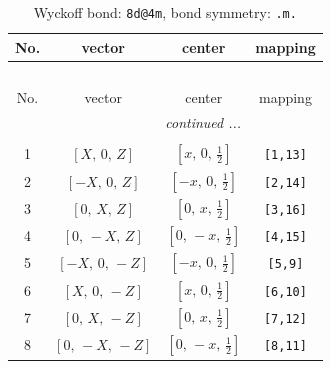 \documentclass[fleqn,8pt]{jsarticle}
\begin{document}
\begin{longtable}{cccc}
\caption{Wyckoff bond: {\tt 8d@4m}, bond symmetry: {\tt .m.}}
 \\
 \hline \hline
No. & vector & center & mapping \\ \hline \endfirsthead

\multicolumn{3}{l}{\tablename\ \thetable{}} \\
 \hline \hline
No. & vector & center & mapping \\ \hline \endhead

 \hline \hline
\multicolumn{3}{r}{\footnotesize\it continued ...} \\ \endfoot

 \hline \hline
\multicolumn{3}{r}{} \\ \endlastfoot

1 & $\left[ X,\, 0,\, Z \right]$ & $\left[ x,\, 0,\, \frac{1}{2} \right]$ & {\tt [1,13]} \\ \hline
2 & $\left[ - X,\, 0,\, Z \right]$ & $\left[ - x,\, 0,\, \frac{1}{2} \right]$ & {\tt [2,14]} \\ \hline
3 & $\left[ 0,\, X,\, Z \right]$ & $\left[ 0,\, x,\, \frac{1}{2} \right]$ & {\tt [3,16]} \\ \hline
4 & $\left[ 0,\, - X,\, Z \right]$ & $\left[ 0,\, - x,\, \frac{1}{2} \right]$ & {\tt [4,15]} \\ \hline
5 & $\left[ - X,\, 0,\, - Z \right]$ & $\left[ - x,\, 0,\, \frac{1}{2} \right]$ & {\tt [5,9]} \\ \hline
6 & $\left[ X,\, 0,\, - Z \right]$ & $\left[ x,\, 0,\, \frac{1}{2} \right]$ & {\tt [6,10]} \\ \hline
7 & $\left[ 0,\, X,\, - Z \right]$ & $\left[ 0,\, x,\, \frac{1}{2} \right]$ & {\tt [7,12]} \\ \hline
8 & $\left[ 0,\, - X,\, - Z \right]$ & $\left[ 0,\, - x,\, \frac{1}{2} \right]$ & {\tt [8,11]} \\
\end{longtable}
\renewcommand{\arraystretch}{1.2}
\end{document}
